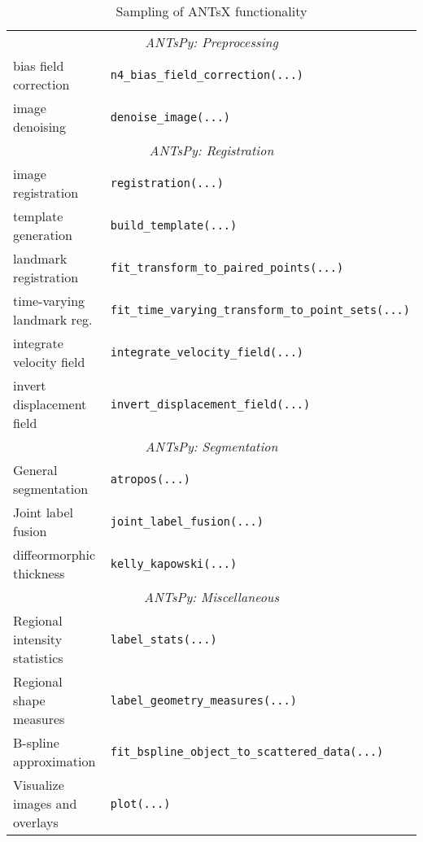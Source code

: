 
\begin{table}
  \small
   \centering
   \vspace{-0.25cm}
   \caption{Sampling of ANTsX functionality} 
   \begin{tabular*}{0.95\textwidth}{l @{\extracolsep{\fill}} p{}}
    \toprule
    \multicolumn{2}{c}{\cellcolor{gray!25} \em ANTsPy: Preprocessing} \\
    \cmidrule[1pt](lr){1-2}
    bias field correction & \texttt{n4\_bias\_field\_correction(...)} \\
    image denoising  & \texttt{denoise\_image(...)} \\
    \cmidrule[1pt](lr){1-2}
    \multicolumn{2}{c}{\cellcolor{gray!25} \em ANTsPy: Registration} \\
    \cmidrule[1pt](lr){1-2}
    image registration & \texttt{registration(...)} \\
    template generation  & \texttt{build\_template(...)} \\
    landmark registration & \texttt{fit\_transform\_to\_paired\_points(...)} \\
    time-varying landmark reg. & \texttt{fit\_time\_varying\_transform\_to\_point\_sets(...)} \\
    integrate velocity field & \texttt{integrate\_velocity\_field(...)} \\
    invert displacement field & \texttt{invert\_displacement\_field(...)} \\
    \cmidrule[1pt](lr){1-2}
    \multicolumn{2}{c}{\cellcolor{gray!25} \em ANTsPy: Segmentation} \\
    \cmidrule[1pt](lr){1-2}
    General segmentation & \texttt{atropos(...)} \\
    Joint label fusion & \texttt{joint\_label\_fusion(...)} \\
    diffeormorphic thickness   & \texttt{kelly\_kapowski(...)} \\
    \cmidrule[1pt](lr){1-2}
    \multicolumn{2}{c}{\cellcolor{gray!25} \em ANTsPy: Miscellaneous} \\
    \cmidrule[1pt](lr){1-2}
    Regional intensity statistics & \texttt{label\_stats(...)} \\
    Regional shape measures & \texttt{label\_geometry\_measures(...)} \\
    B-spline approximation & \texttt{fit\_bspline\_object\_to\_scattered\_data(...)} \\
    Visualize images and overlays\,\,\,\,\,\,\,\,\,\,\,\, & \texttt{plot(...)} \\

\end{tabular*}
\end{table}
